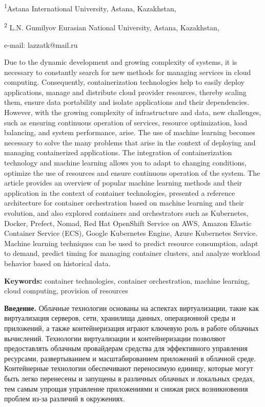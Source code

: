 \textsuperscript{1}Astana International University, Astana, Kazakhstan,

\textsuperscript{2} L.N. Gumilyov Eurasian National University, Astana,
Kazakhstan,

e-mail: lazzatk@mail.ru

Due to the dynamic development and growing complexity of systems, it is
necessary to constantly search for new methods for managing services in
cloud computing. Consequently, containerization technologies help to
easily deploy applications, manage and distribute cloud provider
resources, thereby scaling them, ensure data portability and isolate
applications and their dependencies. However, with the growing
complexity of infrastructure and data, new challenges, such as ensuring
continuous operation of services, resource optimization, load balancing,
and system performance, arise. The use of machine learning becomes
necessary to solve the many problems that arise in the context of
deploying and managing containerized applications. The integration of
containerization technology and machine learning allows you to adapt to
changing conditions, optimize the use of resources and ensure continuous
operation of the system. The article provides an overview of popular
machine learning methods and their application in the context of
container technologies, presented a reference architecture for container
orchestration based on machine learning and their evolution, and also
explored containers and orchestrators such as Kubernetes, Docker,
Prefect, Nomad, Red Hat OpenShift Service on AWS, Amazon Elastic
Container Service (ECS), Google Kubernetes Engine, Azure Kubernetes
Service. Machine learning techniques can be used to predict resource
consumption, adapt to demand, predict timing for managing container
clusters, and analyze workload behavior based on historical data.

{\bfseries Keywords:} container technologies, container orchestration,
machine learning, cloud computing, provision of resources

{\bfseries Введение.} Облачные технологии основаны на аспектах
виртуализации, такие как виртуализация серверов, сети, хранилища данных,
операционной среды и приложений, а также контейнеризация играют ключевую
роль в работе облачных вычислений. Технологии виртуализации и
контейнеризации позволяют предоставлять облачным провайдерам средства
для эффективного управления ресурсами, развертыванием и масштабированием
приложений в облачной среде. Контейнерные технологии обеспечивают
переносимую единицу, которые могут быть легко перенесены и запущены в
различных облачных и локальных средах, тем самым упрощая управление
приложениями и снижая риск возникновения проблем из-за различий в
окружениях.

